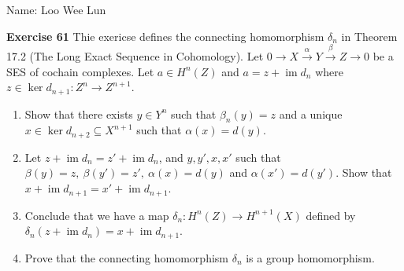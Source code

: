 \documentclass{article}
\theoremstyle{definition}
\newcommand{\im}{\operatorname{im}}
\newcommand{\xto}[1]{\xrightarrow{#1}}
\begin{document}
Name: Loo Wee Lun

\medskip

\textbf{Exercise 61} Thie exericse defines the connecting homomorphism $\delta_n$ in Theorem 17.2 (The Long Exact Sequence in Cohomology). Let $0\to X\xto{\alpha}Y\xto{\beta} Z \to 0 $ be a SES of cochain complexes. Let $a\in H^n(Z)$ and $a=z + \im d_n$ where $z\in \ker d_{n+1} :Z^n \to Z^{n+1}$.
\begin{enumerate}
    \item Show that there exists $y\in Y^n$ such that $\beta_n(y) = z$ and a unique $x\in \ker d_{n+2}\subseteq X^{n+1}$ such that $\alpha(x) = d(y)$.
    \item Let $z + \im d_n = z' + \im d_n$, and $y,y', x, x'$ such that $\beta(y)=z,\ \beta(y')=z',\ \alpha(x) = d(y)$ and $\alpha(x')=d(y')$. Show that $x + \im d_{n+1} = x' + \im d_{n+1}$.
    \item Conclude that we have a map $\delta_n:H^n(Z) \to H^{n+1}(X)$ defined by $\delta_n(z+\im d_n) = x + \im d_{n+1}$.
    \item Prove that the connecting homomorphism $\delta_n$ is a group homomorphism.
\end{enumerate}
\end{document}
